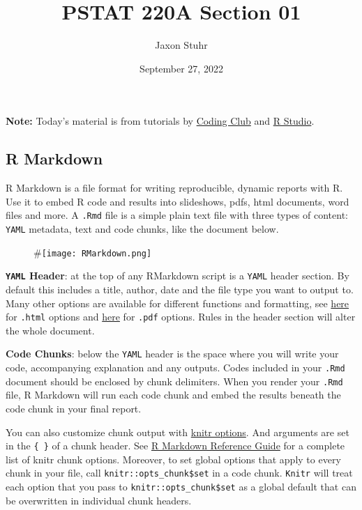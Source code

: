 \documentclass[
  11pt,
]{article}
\title{PSTAT 220A Section 01}
\author{Jaxon Stuhr}
\date{September 27, 2022}
\begin{document}
\maketitle

\textbf{Note:} Today's material is from tutorials by
\href{https://ourcodingclub.github.io/tutorials/rmarkdown/}{Coding Club}
and \href{https://rmarkdown.rstudio.com/index.html}{R Studio}.

\hypertarget{r-markdown}{%
\subsection{R Markdown}\label{r-markdown}}

R Markdown is a file format for writing reproducible, dynamic reports
with R. Use it to embed R code and results into slideshows, pdfs, html
documents, word files and more. A \texttt{.Rmd} file is a simple plain
text file with three types of content: \texttt{YAML} metadata, text and
code chunks, like the document below.

\begin{figure}
\begin{center}
#\texttt{[image: RMarkdown.png]}
\end{center}
\end{figure}

\textbf{\texttt{YAML} Header}: at the top of any RMarkdown script is a
\texttt{YAML} header section. By default this includes a title, author,
date and the file type you want to output to. Many other options are
available for different functions and formatting, see
\href{https://bookdown.org/yihui/rmarkdown/html-document.html}{here} for
\texttt{.html} options and
\href{https://bookdown.org/yihui/rmarkdown/pdf-document.html}{here} for
\texttt{.pdf} options. Rules in the header section will alter the whole
document.

\textbf{Code Chunks}: below the \texttt{YAML} header is the space where
you will write your code, accompanying explanation and any outputs.
Codes included in your \texttt{.Rmd} document should be enclosed by
chunk delimiters. When you render your \texttt{.Rmd} file, R Markdown
will run each code chunk and embed the results beneath the code chunk in
your final report.

You can also customize chunk output with
\href{https://yihui.org/knitr/options/}{knitr options}. And arguments
are set in the \texttt{\{ \}} of a chunk header. See
\href{https://rstudio.com/wp-content/uploads/2015/03/rmarkdown-reference.pdf?_ga=2.34482913.1386655696.1601928126-343717157.1601928126}{R
Markdown Reference Guide} for a complete list of knitr chunk options.
Moreover, to set global options that apply to every chunk in your file,
call \texttt{knitr::opts\_chunk\$set} in a code chunk. \texttt{Knitr}
will treat each option that you pass to \texttt{knitr::opts\_chunk\$set}
as a global default that can be overwritten in individual chunk headers.
\end{document}
